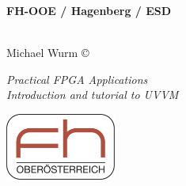 


\author{Michael Wurm}



\newcommand{\UebungNr}{UVVM Tutorial}
\newcommand{\UebungTopic}{A brief introduction to UVVM, with a\\
	tutorial on how to use it in an example testbench.}

\clearpage

\newpage
\thispagestyle{empty}
\tableofcontents
\newpage
\setcounter{page}{1}  %

\thispagestyle{empty}
\begin{minipage}[b][2.4cm]{0.7\textwidth}
	\noindent
	\raggedright
	\begin{large}\textbf{%
			FH-OOE / Hagenberg / ESD\\
			\ \\
		}\end{large}
	Michael Wurm \copyright\,\the\year\\
	\begin{large}
		\textit{Practical FPGA Applications}\\
		\vspace{0.0em} \textit{Introduction and tutorial to UVVM }%
	\end{large}
\end{minipage}
\hfill
\includegraphics[height=2.2cm]{./img/FhOOeLogoFeb2005}
\horizontalLine{0.12mm}

\lfoot{}
\cfoot{-\thepage-}
\rfoot{}
\noindent




